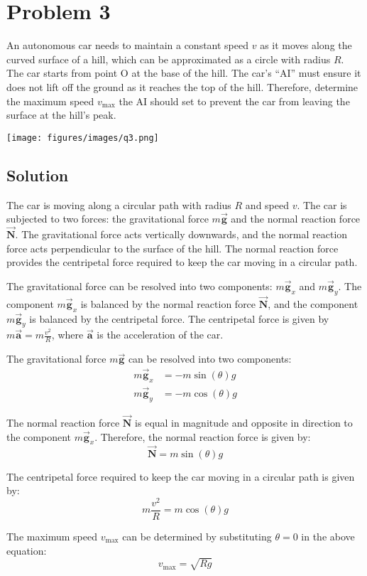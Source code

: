 \section*{Problem 3}

An autonomous car needs to maintain a constant speed \( v \) as it moves along the curved surface of a hill, which can be approximated as a circle with radius \( R \).
The car starts from point O at the base of the hill.
The car's ``AI'' must ensure it does not lift off the ground as it reaches the top of the hill.
Therefore, determine the maximum speed \( v_{\max} \) the AI should set to prevent the car from leaving the surface at the hill's peak.

\begin{figure*}[h]
    \centering
    \texttt{[image: figures/images/q3.png]}
\end{figure*}

\subsection*{Solution}

The car is moving along a circular path with radius \( R \) and speed \( v \).
The car is subjected to two forces: the gravitational force \( m\vec{\mathbf{g}} \) and the normal reaction force \( \vec{\mathbf{N}} \).
The gravitational force acts vertically downwards, and the normal reaction force acts perpendicular to the surface of the hill.
The normal reaction force provides the centripetal force required to keep the car moving in a circular path.

The gravitational force can be resolved into two components: \( m\vec{\mathbf{g}}_x \) and \( m\vec{\mathbf{g}}_y \).
The component \( m\vec{\mathbf{g}}_x \) is balanced by the normal reaction force \( \vec{\mathbf{N}} \), and the component \( m\vec{\mathbf{g}}_y \) is balanced by the centripetal force.
The centripetal force is given by \( m\vec{\mathbf{a}} = m\frac{v^2}{R} \), where \( \vec{\mathbf{a}} \) is the acceleration of the car.

The gravitational force \( m\vec{\mathbf{g}} \) can be resolved into two components:
\begin{align*}
    m\vec{\mathbf{g}}_x & = -m\sin(\theta)g \\
    m\vec{\mathbf{g}}_y & = -m\cos(\theta)g
\end{align*}

The normal reaction force \( \vec{\mathbf{N}} \) is equal in magnitude and opposite in direction to the component \( m\vec{\mathbf{g}}_x \).
Therefore, the normal reaction force is given by:
\[
    \vec{\mathbf{N}} = m\sin(\theta)g
\]

The centripetal force required to keep the car moving in a circular path is given by:
\[
    m\frac{v^2}{R} = m\cos(\theta)g
\]

The maximum speed \( v_{\max} \) can be determined by substituting \( \theta = 0 \) in the above equation:
\[
    v_{\max} = \sqrt{Rg}
\]
